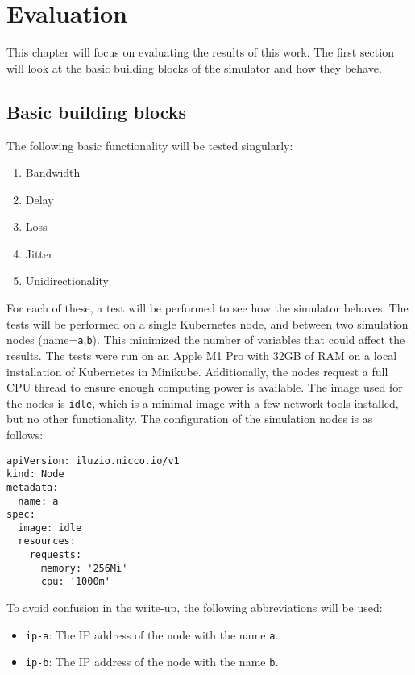 \chapter{Evaluation}

This chapter will focus on evaluating the results of this work.
The first section will look at the basic building blocks of the simulator and how they behave.

\section{Basic building blocks}

The following basic functionality will be tested singularly:

\begin{enumerate}
  \item Bandwidth
  \item Delay
  \item Loss
  \item Jitter
  \item Unidirectionality
\end{enumerate}

For each of these, a test will be performed to see how the simulator behaves. The tests will be performed on a single Kubernetes node, and between two simulation nodes (name=\verb|a|,\verb|b|). This minimized the number of variables that could affect the results.
The tests were run on an Apple M1 Pro with 32GB of RAM on a local installation of Kubernetes in Minikube.
Additionally, the nodes request a full CPU thread to ensure enough computing power is available. The image used for the nodes is \verb|idle|, which is a minimal image with a few network tools installed, but no other functionality.
The configuration of the simulation nodes is as follows:

\begin{verbatim}
apiVersion: iluzio.nicco.io/v1
kind: Node
metadata:
  name: a
spec:
  image: idle
  resources:
    requests:
      memory: '256Mi'
      cpu: '1000m'
\end{verbatim}

To avoid confusion in the write-up, the following abbreviations will be used:

\begin{itemize}
  \item \verb|ip-a|: The IP address of the node with the name \verb|a|.
  \item \verb|ip-b|: The IP address of the node with the name \verb|b|.
\end{itemize}


